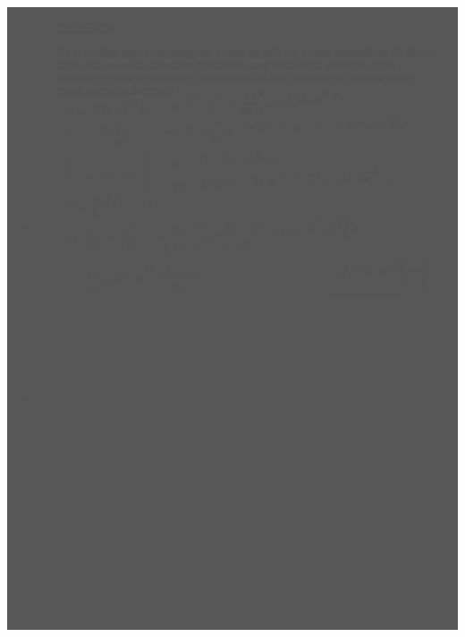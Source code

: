 {\includegraphics[width=17.498cm,height=24.13cm]{Pictures/10000001000002570000033B834634AAD14CB84E.png}

}
